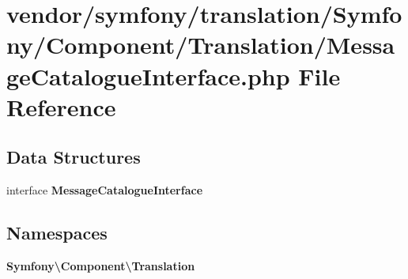 \section{vendor/symfony/translation/\+Symfony/\+Component/\+Translation/\+Message\+Catalogue\+Interface.php File Reference}
\label{_message_catalogue_interface_8php}
\subsection*{Data Structures}
\begin{DoxyCompactItemize}
\item 
interface {\bf Message\+Catalogue\+Interface}
\end{DoxyCompactItemize}
\subsection*{Namespaces}
\begin{DoxyCompactItemize}
\item 
 {\bf Symfony\textbackslash{}\+Component\textbackslash{}\+Translation}
\end{DoxyCompactItemize}
